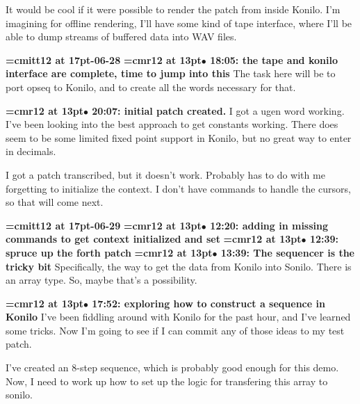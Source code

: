 It would be cool if it were possible to render the patch from inside Konilo. I'm imagining for offline rendering, I'll have some kind of tape interface, where I'll be able to dump streams of buffered data into WAV files.
\par

{\medskip\noindent\bf\font\titlefont=cmitt12 at 17pt-06-28}\medskip
{\smallskip\noindent\bf\font\titlefont=cmr12 at 13pt\titlefont $\bullet$ 18:05: the tape and konilo interface are complete, time to jump into this}\smallskip
The task here will be to port opseq to Konilo, and to create all the words necessary for that.
\par

{\smallskip\noindent\bf\font\titlefont=cmr12 at 13pt\titlefont $\bullet$ 20:07: initial patch created.}\smallskip
I got a ugen word working. I've been looking into the best approach to get constants working. There does seem to be some limited fixed point support in Konilo, but no great way to enter in decimals.
\par

I got a patch transcribed, but it doesn't work. Probably has to do with me forgetting to initialize the context. I don't have commands to handle the cursors, so that will come next.
\par

{\medskip\noindent\bf\font\titlefont=cmitt12 at 17pt-06-29}\medskip
{\smallskip\noindent\bf\font\titlefont=cmr12 at 13pt\titlefont $\bullet$ 12:20: adding in missing commands to get context initialized and set}\smallskip
{\smallskip\noindent\bf\font\titlefont=cmr12 at 13pt\titlefont $\bullet$ 12:39: spruce up the forth patch}\smallskip
{\smallskip\noindent\bf\font\titlefont=cmr12 at 13pt\titlefont $\bullet$ 13:39: The sequencer is the tricky bit}\smallskip
Specifically, the way to get the data from Konilo into Sonilo. There is an array type. So, maybe that's a possibility.
\par

{\smallskip\noindent\bf\font\titlefont=cmr12 at 13pt\titlefont $\bullet$ 17:52: exploring how to construct a sequence in Konilo}\smallskip
I've been fiddling around with Konilo for the past hour, and I've learned some tricks. Now I'm going to see if I can commit any of those ideas to my test patch.
\par

I've created an 8-step sequence, which is probably good enough for this demo. Now, I need to work up how to set up the logic for transfering this array to sonilo.
\par


